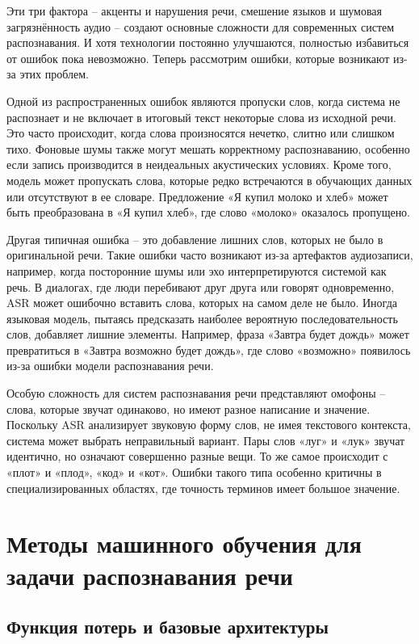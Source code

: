 Эти три фактора -- акценты и нарушения речи, смешение языков и шумовая загрязнённость аудио -- создают основные сложности для современных систем распознавания.
И хотя технологии постоянно улучшаются, полностью избавиться от ошибок пока невозможно.
Теперь рассмотрим ошибки, которые возникают из-за этих проблем.

Одной из распространенных ошибок являются пропуски слов, когда система не распознает и не включает в итоговый текст некоторые слова из исходной речи.
Это часто происходит, когда слова произносятся нечетко, слитно или слишком тихо.
Фоновые шумы также могут мешать корректному распознаванию, особенно если запись производится в неидеальных акустических условиях.
Кроме того, модель может пропускать слова, которые редко встречаются в обучающих данных или отсутствуют в ее словаре.
Предложение «Я купил молоко и хлеб» может быть преобразована в «Я купил хлеб», где слово «молоко» оказалось пропущено.

Другая типичная ошибка -- это добавление лишних слов, которых не было в оригинальной речи.
Такие ошибки часто возникают из-за артефактов аудиозаписи, например, когда посторонние шумы или эхо интерпретируются системой как речь.
В диалогах, где люди перебивают друг друга или говорят одновременно, ASR может ошибочно вставить слова, которых на самом деле не было.
Иногда языковая модель, пытаясь предсказать наиболее вероятную последовательность слов, добавляет лишние элементы.
Например, фраза «Завтра будет дождь» может превратиться в «Завтра возможно будет дождь», где слово «возможно» появилось из-за ошибки модели распознавания речи.

Особую сложность для систем распознавания речи представляют омофоны -- слова, которые звучат одинаково, но имеют разное написание и значение.
Поскольку ASR анализирует звуковую форму слов, не имея текстового контекста, система может выбрать неправильный вариант.
Пары слов «луг» и «лук» звучат идентично, но означают совершенно разные вещи.
То же самое происходит с «плот» и «плод», «код» и «кот».
Ошибки такого типа особенно критичны в специализированных областях, где точность терминов имеет большое значение.

\section{Методы машинного обучения для задачи распознавания речи}

\subsection{Функция потерь и базовые архитектуры}

